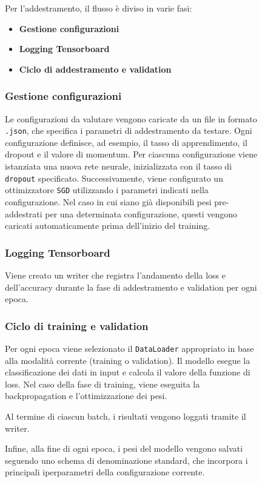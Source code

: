 \begin{figure}[H]
Per l'addestramento, il flusso è diviso in varie fasi:
\begin{itemize}
    \item \textbf{Gestione configurazioni}
    \item \textbf{Logging Tensorboard}
    \item \textbf{Ciclo di addestramento e validation}
 \end{itemize}

\subsubsection*{Gestione configurazioni}
Le configurazioni da valutare vengono caricate da un file in formato \texttt{.json}, che specifica i parametri di addestramento da testare.  
Ogni configurazione definisce, ad esempio, il tasso di apprendimento, il dropout e il valore di momentum. Per ciascuna configurazione viene istanziata una nuova rete neurale, inizializzata con il tasso di \texttt{dropout} specificato.  
Successivamente, viene configurato un ottimizzatore \texttt{SGD} utilizzando i parametri indicati nella configurazione.  
Nel caso in cui siano già disponibili pesi pre-addestrati per una determinata configurazione, questi vengono caricati automaticamente prima dell'inizio del training.

\subsubsection*{Logging Tensorboard}
Viene creato un writer che registra l'andamento della loss e dell'accuracy durante la fase di addestramento e validation per ogni epoca.

\subsubsection*{Ciclo di training e validation}

Per ogni epoca viene selezionato il \texttt{DataLoader} appropriato in base alla modalità corrente (training o validation).  
Il modello esegue la classificazione dei dati in input e calcola il valore della funzione di loss.  
Nel caso della fase di training, viene eseguita la backpropagation e l'ottimizzazione dei pesi.

Al termine di ciascun batch, i risultati vengono loggati tramite il writer.

Infine, alla fine di ogni epoca, i pesi del modello vengono salvati seguendo uno schema di denominazione standard, che incorpora i principali iperparametri della configurazione corrente.


\end{figure}
